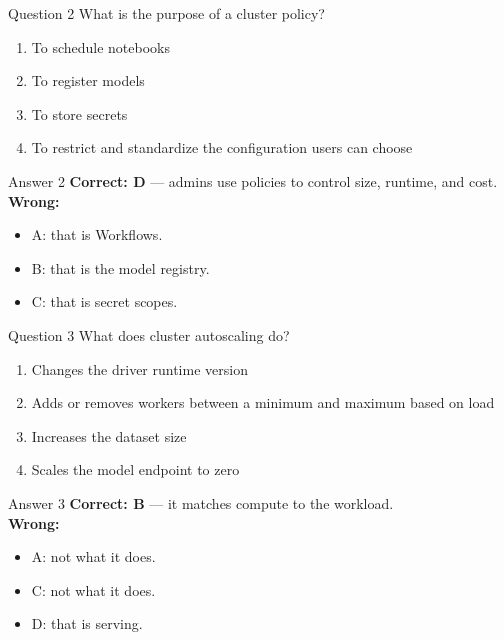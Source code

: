 \documentclass[aspectratio=169,11pt]{beamer}
\begin{document}
\begin{frame}{Question 2}
What is the purpose of a cluster policy?
\begin{enumerate}[label=\Alph*.]
\item To schedule notebooks
\item To register models
\item To store secrets
\item To restrict and standardize the configuration users can choose
\end{enumerate}
\end{frame}
\begin{frame}{Answer 2}
\textbf{Correct: D} --- admins use policies to control size, runtime, and cost.\\
\vspace{0.5em}
\textbf{Wrong:}
\begin{itemize}
\item A: that is Workflows.
\item B: that is the model registry.
\item C: that is secret scopes.
\end{itemize}
\end{frame}

\begin{frame}{Question 3}
What does cluster autoscaling do?
\begin{enumerate}[label=\Alph*.]
\item Changes the driver runtime version
\item Adds or removes workers between a minimum and maximum based on load
\item Increases the dataset size
\item Scales the model endpoint to zero
\end{enumerate}
\end{frame}
\begin{frame}{Answer 3}
\textbf{Correct: B} --- it matches compute to the workload.\\
\vspace{0.5em}
\textbf{Wrong:}
\begin{itemize}
\item A: not what it does.
\item C: not what it does.
\item D: that is serving.
\end{itemize}
\end{frame}
\end{document}
